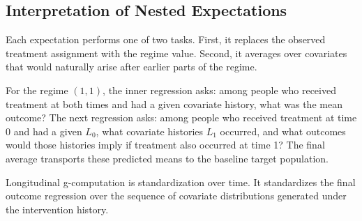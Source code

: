 \subsection{Interpretation of Nested Expectations}

Each expectation performs one of two tasks. First, it replaces the observed
treatment assignment with the regime value. Second, it averages over covariates
that would naturally arise after earlier parts of the regime.

For the regime $(1,1)$, the inner regression asks: among people who received
treatment at both times and had a given covariate history, what was the mean
outcome? The next regression asks: among people who received treatment at time
0 and had a given $L_0$, what covariate histories $L_1$ occurred, and what
outcomes would those histories imply if treatment also occurred at time 1? The
final average transports these predicted means to the baseline target population.

\begin{keyidea}
Longitudinal g-computation is standardization over time. It standardizes the
final outcome regression over the sequence of covariate distributions generated
under the intervention history.
\end{keyidea}
